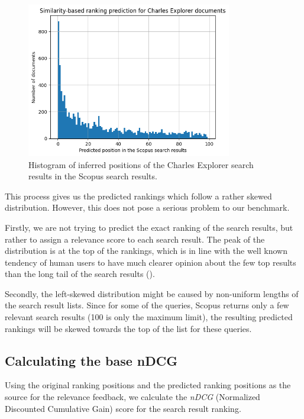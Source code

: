 \begin{figure}[ht!]
    \captionsetup{width=.9\linewidth}
    \includegraphics[width=0.8\textwidth]{../img/llm-embedding-positions-hist.png}
    \centering
    \caption{Histogram of inferred positions of the Charles Explorer search results in the Scopus search results.}
\end{figure}

This process gives us the predicted rankings which follow a rather skewed distribution. 
However, this does not pose a serious problem to our benchmark.

Firstly, we are not trying to predict the exact ranking of the search results, but rather to assign a relevance score to each search result. 
The peak of the distribution is at the top of the rankings, 
which is in line with the well known tendency of human users 
to have much clearer opinion about the few top results than the long tail of the search results (\cite{9357332}).

Secondly, the left-skewed distribution might be caused by non-uniform lengths of the search result lists. 
Since for some of the queries, Scopus returns only a few relevant search results (100 is only the maximum limit), 
the resulting predicted rankings will be skewed towards the top of the list for these queries.

\subsection{Calculating the base nDCG}

Using the original ranking positions and the predicted ranking positions as the source for the 
relevance feedback, we calculate the \textit{nDCG} (Normalized Discounted Cumulative Gain) score for the 
search result ranking.

